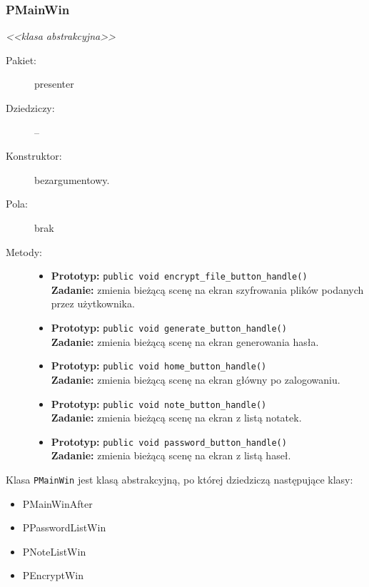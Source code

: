 \documentclass[a4paper]{article}
\newcommand{\prog}{\texttt}
\begin{document}
\subsubsection{PMainWin}
\textit{<<klasa abstrakcyjna>>}
\begin{description}
    \item[Pakiet:] presenter
    \item[Dziedziczy:] --
    \item[Konstruktor:] bezargumentowy.
    \item[Pola:]brak
    \item[Metody:] \hfill
    \begin{itemize}
        \item \textbf{Prototyp:} \prog{public void encrypt\_file\_button\_handle()}\\\textbf{Zadanie:} zmienia bieżącą scenę na ekran szyfrowania plików podanych przez użytkownika.
        \item \textbf{Prototyp:} \prog{public void generate\_button\_handle()}\\\textbf{Zadanie:} zmienia bieżącą scenę na ekran generowania hasła.
        \item \textbf{Prototyp:} \prog{public void home\_button\_handle()}\\\textbf{Zadanie:} zmienia bieżącą scenę na ekran główny po zalogowaniu.
        \item \textbf{Prototyp:} \prog{public void note\_button\_handle()}\\\textbf{Zadanie:} zmienia bieżącą scenę na ekran z listą notatek.
        \item \textbf{Prototyp:} \prog{public void password\_button\_handle()}\\\textbf{Zadanie:} zmienia bieżącą scenę na ekran z listą haseł.
    \end{itemize}
\end{description}
Klasa \prog{PMainWin} jest klasą abstrakcyjną, po której dziedziczą następujące klasy:
\begin{itemize}
    \item PMainWinAfter
    \item PPasswordListWin
    \item PNoteListWin
    \item PEncryptWin
\end{itemize}
\end{document}
